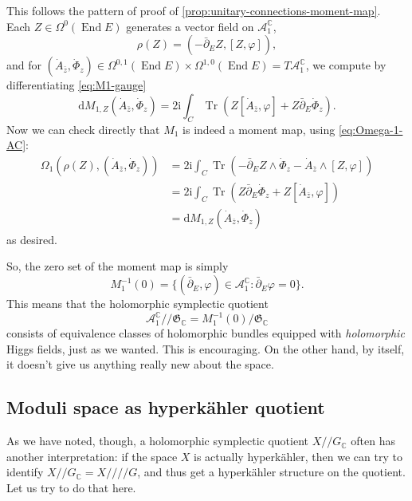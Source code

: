 \documentclass[12pt,letterpaper,reqno]{article}
\numberwithin{equation}{section}
\newcommand{\fG}{{\mathfrak G}}
\newcommand{\cA}{\ensuremath{\mathcal A}}
\newcommand{\C}{\ensuremath{\mathbb C}}
\newcommand{\kq}{/\!\!/}
\newcommand{\hk}{hyperk\"ahler\xspace}
\newcommand{\hkq}{/\!\!/\!\!/\!\!/}
\newcommand{\I}{{\mathrm i}}
\newcommand{\de}{\mathrm{d}}
\newcommand{\ti}[1]{\textit{#1}}
\DeclareMathOperator{\Tr}{Tr}
\DeclareMathOperator{\End}{End}
\begin{document}
\begin{pf} This follows the pattern of proof of \autoref{prop:unitary-connections-moment-map}.
Each $Z \in \Omega^0(\End E)$ generates a vector field on $\cA_1^\C$,
\begin{equation}
  \rho(Z) = (- \bar\partial_E Z, [Z,\varphi]),
\end{equation}
and for
$(\dot A_{\bar z},\dot\Phi_z) \in \Omega^{0,1}(\End E) \times \Omega^{1,0}(\End E) = T\cA_1^\C$,
we compute by differentiating \eqref{eq:M1-gauge}
\begin{equation}
  \de M_{1,Z} (\dot A_{\bar z},\dot\Phi_z) = 2 \I \int_C \Tr( Z [\dot A_{\bar z},\varphi] + Z \bar\partial_E \dot\Phi_z).
\end{equation}
Now we can check directly that $M_1$ is indeed a moment map, using \eqref{eq:Omega-1-AC}:
\begin{align}
  \Omega_1(\rho(Z), (\dot A_{\bar z},\dot\Phi_z)) &= 2 \I \int_C \Tr(- \bar\partial_E Z \wedge \dot\Phi_z - \dot A_{\bar z} \wedge [Z,\varphi]) \\
  &= 2 \I \int_C \Tr(Z \bar\partial_E \dot\Phi_z + Z[\dot A_{\bar z},\varphi]) \\
  &= \de M_{1,Z}(\dot A_{\bar z},\dot\Phi_z)
\end{align}
as desired.
\end{pf}

So, the zero set of the moment map is simply
\begin{equation}
	M_1^{-1}(0) = \{ (\bar\partial_E, \varphi ) \in \cA^\C_1: \bar\partial_E \varphi = 0 \}.
\end{equation}
This means that
the holomorphic symplectic quotient
\begin{equation}
 \cA^\C_1 \kq \fG_\C = M_1^{-1}(0) / \fG_\C
\end{equation}
consists of equivalence classes of holomorphic bundles equipped
with \ti{holomorphic} Higgs fields, just as we wanted.
This is encouraging. On the other hand, by itself, it doesn't
give us anything really new about the space.


\subsection{Moduli space as \hk quotient}

As we have noted, though, a holomorphic symplectic quotient $X \kq G_\C$
often has another interpretation: if the space $X$ is
actually \hk, then we can try to identify $X \kq G_\C = X \hkq G$,
and thus get a \hk structure on the quotient.
Let us try to do that here.
\end{document}
